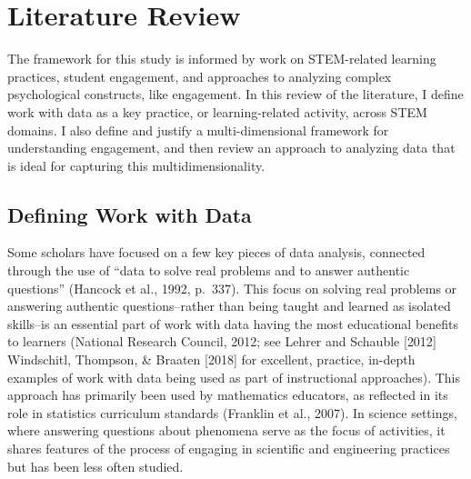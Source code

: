 \documentclass[]{msu-thesis}
\theoremstyle{definition}
\theoremstyle{definition}
\theoremstyle{definition}
\theoremstyle{remark}
\begin{document}
\chapter{Literature Review}\label{literature-review}

The framework for this study is informed by work on STEM-related
learning practices, student engagement, and approaches to analyzing
complex psychological constructs, like engagement. In this review of the
literature, I define work with data as a key practice, or
learning-related activity, across STEM domains. I also define and
justify a multi-dimensional framework for understanding engagement, and
then review an approach to analyzing data that is ideal for capturing
this multidimensionality.

\section{Defining Work with Data}\label{defining-work-with-data}

Some scholars have focused on a few key pieces of data analysis,
connected through the use of ``data to solve real problems and to answer
authentic questions'' (Hancock et al., 1992, p.~337). This focus on
solving real problems or answering authentic questions--rather than
being taught and learned as isolated skills--is an essential part of
work with data having the most educational benefits to learners
(National Research Council, 2012; see Lehrer and Schauble {[}2012{]}
Windschitl, Thompson, \& Braaten {[}2018{]} for excellent, practice,
in-depth examples of work with data being used as part of instructional
approaches). This approach has primarily been used by mathematics
educators, as reflected in its role in statistics curriculum standards
(Franklin et al., 2007). In science settings, where answering questions
about phenomena serve as the focus of activities, it shares features of
the process of engaging in scientific and engineering practices but has
been less often studied.
\end{document}
